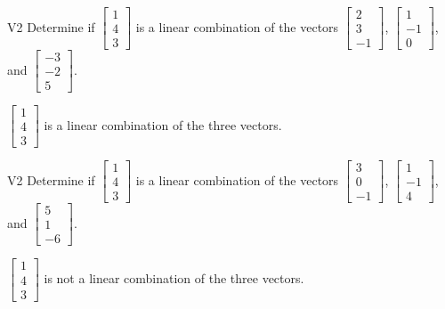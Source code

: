 \begin{problem}{V2}
Determine if \(\begin{bmatrix} 1 \\ 4 \\ 3 \end{bmatrix}\) is a linear combination of the vectors \(\begin{bmatrix} 2 \\ 3 \\ -1 \end{bmatrix}\), \(\begin{bmatrix} 1 \\ -1 \\ 0 \end{bmatrix}\), and \(\begin{bmatrix} -3 \\ -2 \\ 5 \end{bmatrix}\).
\end{problem}
\begin{solution}
\(\begin{bmatrix} 1 \\ 4 \\ 3 \end{bmatrix}\) is a linear combination of the three vectors.
\end{solution}

\begin{problem}{V2} 
Determine if \(\begin{bmatrix} 1 \\ 4 \\ 3 \end{bmatrix}\) is a linear combination of the vectors \(\begin{bmatrix} 3 \\ 0 \\ -1 \end{bmatrix}\), \(\begin{bmatrix} 1 \\ -1 \\ 4 \end{bmatrix}\), and \(\begin{bmatrix} 5 \\ 1 \\  -6 \end{bmatrix}\).
\end{problem}
\begin{solution}
\(\begin{bmatrix} 1 \\ 4 \\ 3 \end{bmatrix}\) is not a linear combination of the three vectors.
\end{solution}


